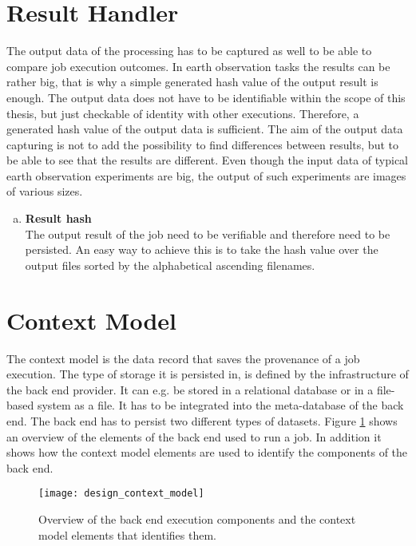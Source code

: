 \documentclass[draft,final]{vutinfth} %
\begin{document}
\section{Result Handler}\label{Design:Result Handler}
The output data of the processing has to be captured as well to be able to compare job execution outcomes. In earth observation tasks the results can be rather big, that is why a simple generated hash value of the output result is enough. The output data does not have to be identifiable within the scope of this thesis, but just checkable of identity with other executions. Therefore, a generated hash value of the output data is sufficient. The aim of the output data capturing is not to add the possibility to find differences between results, but to be able to see that the results are different. Even though the input data of typical earth observation experiments are big, the output of such experiments are images of various sizes.   

\begin{enumerate}[(f)]
	\item \textbf{Result hash} \\
	The output result of the job need to be verifiable and therefore need to be persisted. An easy way to achieve this is to take the hash value over the output files sorted by the alphabetical ascending filenames.
\end{enumerate}

 
\section{Context Model}\label{Design:Context Model}

The context model is the data record that saves the provenance of a job execution. The type of storage it is persisted in, is defined by the infrastructure of the back end provider. It can e.g. be stored in a relational database or in a file-based system as a file. It has to be integrated into the meta-database of the back end. The back end has to persist two different types of datasets. Figure \ref{fig:design_contextmodel} shows an overview of the elements of the back end used to run a job. In addition it shows how the context model elements are used to identify the components of the back end.

\begin{figure}[h]
	\centering
	\texttt{[image: design\_context\_model]}
	\caption{Overview of the back end execution components and the context model elements that identifies them.}
	\label{fig:design_contextmodel} 
\end{figure}
\end{document}
